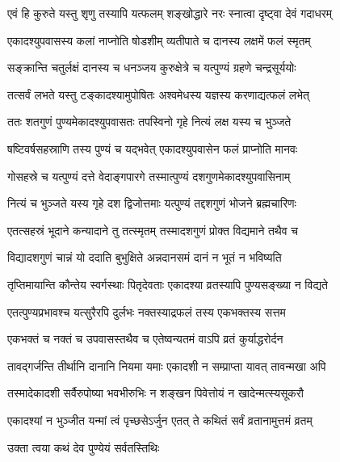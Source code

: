 \twolineshloka
{एवं हि कुरुते यस्तु शृणु तस्यापि यत्फलम्}
{शङ्खोद्धारे नरः स्नात्वा दृष्ट्वा देवं गदाधरम्} %

\twolineshloka
{एकादश्युपवासस्य कलां नाप्नोति षोडशीम्}
{व्यतीपाते च दानस्य लक्षमें फलं स्मृतम्} %

\twolineshloka
{सङ्क्रान्ति चतुर्लक्षं दानस्य च धनञ्जय}
{कुरुक्षेत्रे च यत्पुण्यं ग्रहणे चन्द्रसूर्ययोः} %

\twolineshloka
{तत्सर्वं लभते यस्तु टङ्कादश्यामुपोषितः}
{अश्वमेधस्य यज्ञस्य करणाद्यत्फलं लभेत्} %

\twolineshloka
{ततः शतगुणं पुण्यमेकादश्युपवासतः}
{तपस्विनो गृहे नित्यं लक्ष यस्य च भुञ्जते} %

\twolineshloka
{षष्टिवर्षसहस्राणि तस्य पुण्यं च यद्भवेत्}
{एकादश्युपवासेन फलं प्राप्नोति मानवः} %

\twolineshloka
{गोसहस्रे च यत्पुण्यं दत्ते वेदाङ्गपारगे}
{तस्मात्पुण्यं दशगुणमेकादश्युपवासिनाम्} %

\twolineshloka
{नित्यं च भुञ्जते यस्य गृहे दश द्विजोत्तमाः}
{यत्पुण्यं तद्दशगुणं भोजने ब्रह्मचारिणः} %

\twolineshloka
{एतत्सहस्रं भूदाने कन्यादाने तु तत्स्मृतम्}
{तस्मादशगुणं प्रोक्त विद्यमाने तथैव च} %

\twolineshloka
{विद्यादशगुणं चान्नं यो ददाति बुभुक्षिते}
{अन्नदानसमं दानं न भूतं न भविष्यति} %

\twolineshloka
{तृप्तिमायान्ति कौन्तेय स्वर्गस्थाः पितृदेवताः}
{एकादश्या व्रतस्यापि पुण्यसङ्ख्या न विद्यते} %

\twolineshloka
{एतत्पुण्यप्रभावश्च यत्सुरैरपि दुर्लभः}
{नक्तस्याद्रफलं तस्य एकभक्तस्य सत्तम} %

\twolineshloka
{एकभक्तं च नक्तं च उपवासस्तथैव च}
{एतेष्वन्यतमं वाऽपि व्रतं कुर्याद्धरोर्दन} %

\twolineshloka
{तावद्गर्जन्ति तीर्थानि दानानि नियमा यमाः}
{एकादशी न सम्प्राप्ता यावत् तावन्मखा अपि} %

\twolineshloka
{तस्मादेकादशी सर्वैरुपोष्या भवभीरुभिः}
{न शङ्खन पिवेत्तोयं न खादेन्मत्स्यसूकरौ} %

\twolineshloka
{एकादश्यां न भुञ्जीत यन्मां त्वं पृच्छसेऽर्जुन}
{एतत् ते कथितं सर्वं व्रतानामुत्तमं व्रतम्} %



\onelineshloka
{उक्ता त्वया कथं देव पुण्येयं सर्वतस्तिथिः} %


